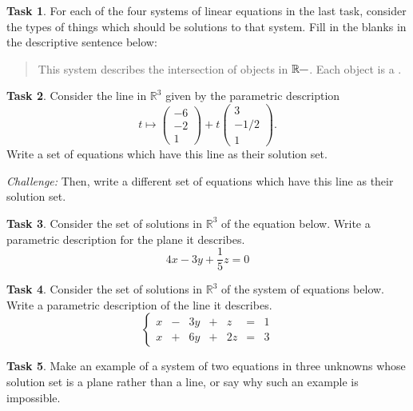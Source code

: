 \documentclass{tufte-book}
\theoremstyle{definition}
\newtheorem{task}{Task}
\begin{document}
\begin{task}
For each of the four systems of linear equations in the last task, consider the types of things which should be solutions to that system. Fill in the blanks in the descriptive sentence below:
\begin{quotation}
This system describes the intersection of \underline{\hspace{1in}} objects in $\mathbb{R}^{\underline{\hspace{.1in}}}$. Each object is a \underline{\hspace{1in}}.
\end{quotation}
\end{task}


\begin{task}
Consider the line in $\mathbb{R}^3$ given by the parametric description
\[
t \mapsto \begin{pmatrix} -6\\-2\\1 \end{pmatrix} + t \begin{pmatrix} 3\\-1/2\\1\end{pmatrix}.
\]
Write a set of equations which have this line as their solution set.

\emph{Challenge:} Then, write a different set of equations which have this line as their solution set.
\end{task}


\begin{task}
Consider the set of solutions in $\mathbb{R}^3$ of the equation below. Write a parametric description for the plane it describes.
\[
4x-3y+ \frac{1}{5}z = 0
\]
\end{task}


\begin{task}
Consider the set of solutions in $\mathbb{R}^3$ of the system of equations below. Write a parametric description of the line it describes.
\[
\left\{\begin{array}{rrrrrrr}
x & - & 3y & + & z & = & 1 \\
x & + & 6y & + & 2z & = & 3
\end{array}\right.
\]
\end{task}

\begin{task}
Make an example of a system of two equations in three unknowns whose solution set is a plane rather than a line, or say why such an example is impossible.
\end{task}
\end{document}
